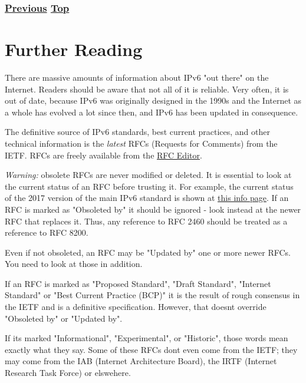 \documentclass[
]{article}
\begin{document}
\subsubsection{\texorpdfstring{\hyperref[advanced-troubleshooting]{Previous}
\hyperref[troubleshooting]{Top}}{Previous Top}}\label{previous-top-6}

\pagebreak

\section{Further Reading}\label{further-reading}

There are massive amounts of information about IPv6 "out there" on the
Internet. Readers should be aware that not all of it is reliable. Very
often, it is out of date, because IPv6 was originally designed in the
1990s and the Internet as a whole has evolved a lot since then, and IPv6
has been updated in consequence.

The definitive source of IPv6 standards, best current practices, and
other technical information is the \emph{latest} RFCs (Requests for
Comments) from the IETF. RFCs are freely available from the
\href{https://www.rfc-editor.org/}{RFC Editor}.

\emph{Warning:} obsolete RFCs are never modified or deleted. It is
essential to look at the current status of an RFC before trusting it.
For example, the current status of the 2017 version of the main IPv6
standard is shown at \href{https://www.rfc-editor.org/info/rfc8200}{this
info page}. If an RFC is marked as "Obsoleted by" it should be ignored -
look instead at the newer RFC that replaces it. Thus, any reference to
RFC 2460 should be treated as a reference to RFC 8200.

Even if not obsoleted, an RFC may be "Updated by" one or more newer
RFCs. You need to look at those in addition.

If an RFC is marked as "Proposed Standard", "Draft Standard", "Internet
Standard" or "Best Current Practice (BCP)" it is the result of rough
consensus in the IETF and is a definitive specification. However, that
doesn\textquotesingle t override "Obsoleted by" or "Updated by".

If it\textquotesingle s marked "Informational", "Experimental", or
"Historic", those words mean exactly what they say. Some of these RFCs
don\textquotesingle t even come from the IETF; they may come from the
IAB (Internet Architecture Board), the IRTF (Internet Research Task
Force) or elswehere.
\end{document}
